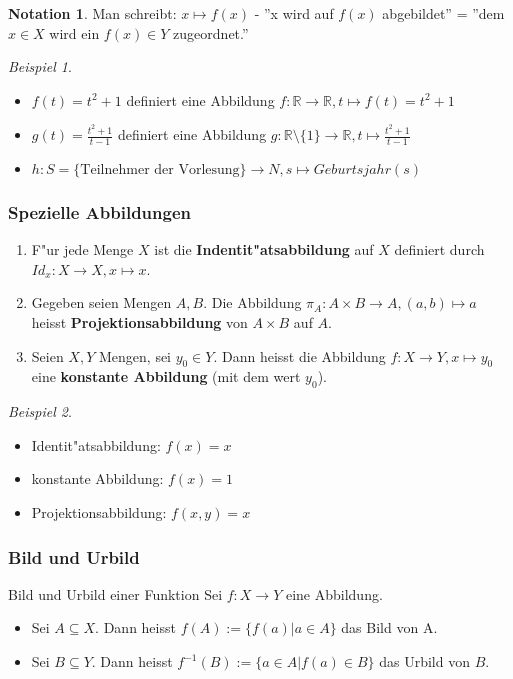 \documentclass[11pt]{article}
\theoremstyle{remark}
\newtheorem{exa}{Beispiel}[section]
\theoremstyle{definition}
\newtheorem*{notation}{Notation}
\theoremstyle{remark}
\begin{document}
\begin{notation}
Man schreibt: \(x\mapsto f(x)\) - ''x wird auf \(f(x)\) abgebildet'' = ''dem \(x\in
X\) wird ein \(f(x)\in Y\) zugeordnet.''
\end{notation}

\begin{exa}\
\begin{itemize}
\item \(f(t)=t^2+1\) definiert eine Abbildung \(f: \mathbb{R}\to \mathbb{R}, t\mapsto f(t)=t^2+1\)
\item \(g(t)= \frac{t^2+1}{t-1}\) definiert eine Abbildung \(g: \mathbb{R}\setminus\{
   1\}\to \mathbb{R}, t\mapsto  \frac{t^2+1}{t-1}\)
\item \(h: S=\{\text{Teilnehmer der Vorlesung}\}\to N, s\mapsto Geburtsjahr(s)\)
\end{itemize}
\end{exa}

\subsubsection{Spezielle Abbildungen}
\label{sec:orge512a75}
\begin{relation}
\begin{enumerate}
\item F"ur jede Menge \(X\) ist die \textbf{Indentit"atsabbildung} auf \(X\) definiert durch \(Id_x:X\to X, x\mapsto x\).
\item Gegeben seien Mengen \(A,B\). Die Abbildung \(\pi_A: A\times B \to A, (a,b)
    \mapsto a\) heisst \textbf{Projektionsabbildung} von \(A\times B\) auf \(A\).
\item Seien \(X,Y\) Mengen, sei \(y_0 \in Y\). Dann heisst die Abbildung \(f: X\to
    Y, x\mapsto y_0\) eine \textbf{konstante Abbildung} (mit dem wert \(y_0\)).
\end{enumerate}
\end{relation}

\begin{exa}\
\begin{itemize}
\item Identit"atsabbildung: \(f(x)=x\)
\item konstante Abbildung: \(f(x)=1\)
\item Projektionsabbildung: \(f(x,y)=x\)
\end{itemize}
\end{exa}

\subsubsection{Bild und Urbild}
\label{sec:org006b051}
\begin{definition}{Bild und Urbild einer Funktion}{}
Sei \(f: X\to Y\) eine Abbildung.
\begin{itemize}
\item Sei \(A\subseteq X\). Dann heisst \(f(A):=\{f(a)|a\in A\}\) das Bild von A.
\item Sei \(B\subseteq Y\). Dann heisst \(f^{-1}(B):=\{a\in A|f(a)\in B\}\) das Urbild von \(B\).
\end{itemize}
\end{definition}
\end{document}
